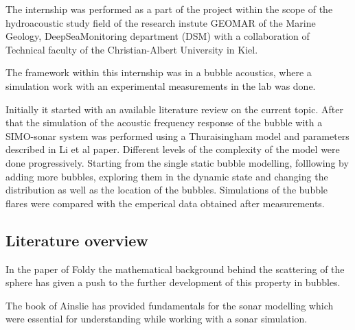 The internship was performed as a part of the project within the scope of the hydroacoustic study field of the research instute GEOMAR of the Marine Geology, DeepSeaMonitoring department (DSM) with a collaboration of Technical faculty of the Christian-Albert University in Kiel. 

The framework within this internship was in a bubble acoustics, where a simulation work with an experimental measurements in the lab was done. 

Initially it started with an available literature review on the current topic. After that the simulation of the acoustic frequency response of the bubble with a SIMO-sonar system was performed using a Thuraisingham model and parameters described in Li et al paper\cite{li_broadband_2020}. Different levels of the complexity of the model were done progressively. Starting from the single static bubble modelling, folllowing by adding more bubbles, exploring them in the dynamic state and changing the distribution as well as the location of the bubbles. Simulations of the bubble flares were compared with the emperical data obtained after measurements.



\subsection{Literature overview} 

In the paper of Foldy the mathematical background behind the scattering of the sphere has given a push to the further development of this property in bubbles.

The book of Ainslie has provided fundamentals for the sonar modelling which were essential for understanding while working with a sonar simulation. 




